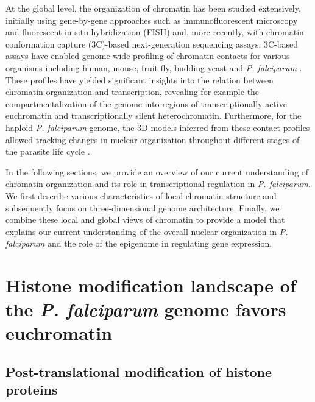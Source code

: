 At the global level, the organization of chromatin has been studied
extensively, initially using gene-by-gene approaches such as immunofluorescent
microscopy and fluorescent in situ hybridization (FISH) and, more recently,
with chromatin conformation capture (3C)-based next-generation sequencing
assays. 3C-based assays have enabled genome-wide profiling of chromatin
contacts for various organisms including human, mouse, fruit fly, budding
yeast and  \textit{P. falciparum} \citep{ay:three-dimensional,
dixon:topological, duan:three, lemieux:genome-wide,
lieberman-aiden:comprehensive, sexton:three-dimensional}. These profiles have
yielded significant insights into the relation between chromatin organization
and transcription, revealing for example the compartmentalization of the
genome into regions of transcriptionally active euchromatin and
transcriptionally silent heterochromatin. Furthermore, for the haploid
\textit{P. falciparum} genome, the 3D models inferred from these contact
profiles allowed tracking changes in nuclear organization throughout different
stages of the parasite life cycle \citep{ay:three-dimensional}.

In the following sections, we provide an overview of our current understanding
of chromatin organization and its role in transcriptional regulation in
\textit{P. falciparum}. We first describe various characteristics of local
chromatin structure and subsequently focus on three-dimensional genome
architecture. Finally, we combine these local and global views of chromatin to
provide a model that explains our current understanding of the overall nuclear
organization in \textit{P. falciparum} and the role of the epigenome in
regulating gene expression.

\section{Histone modification landscape of the \textit{P. falciparum} genome favors
euchromatin}

\subsection{Post-translational modification of histone proteins}

